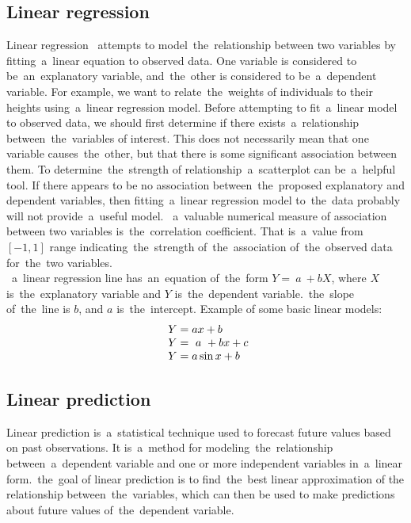         \subsection{Linear regression}\label{sec:linear}
        Linear regression~\cite{Levinson} attempts to model~the~relationship between two variables by fitting~a~linear
        equation to observed data. One variable is considered to be~an~explanatory variable, and~the~other is
        considered to be~a~dependent variable. For example, we want to relate~the~weights of individuals to their
        heights using~a~linear regression model. Before attempting to fit~a~linear model to observed data, we should
        first determine if there exists~a~relationship between~the~variables of interest. This does not necessarily
        mean that one variable causes~the~other, but that there is some significant association between them.
        To determine~the~strength of relationship~a~scatterplot can be~a~helpful tool.
        If there appears to be no association between~the~proposed explanatory and dependent variables, then
        fitting~a~linear regression model to~the~data probably will not provide~a~useful model.
       ~a~valuable numerical measure of association between two variables is~the~correlation coefficient.
        That is~a~value from $[-1, 1]$ range indicating~the~strength of~the~association of~the~observed data
        for~the~two variables.\\
       ~a~linear regression line has~an~equation of~the~form $Y =~a~+ bX$, where $X$ is~the~explanatory variable
        and $Y$ is~the~dependent variable.~the~slope of~the~line is $b$, and $a$ is~the~intercept.
        Example of some basic linear models:\\
        \begin{equation} \label{eq:4}
        \begin{array}{l@{}l}
            Y = ax + b\\
            Y =~a~+ bx + c\\
            Y = a\sin x + b\\
        \end{array}
        \end{equation}
        \subsection{Linear prediction}\label{subsec:lp}
        Linear prediction is~a~statistical technique used to forecast future values based on past observations.
        It is~a~method for modeling~the~relationship between~a~dependent variable and one or more independent
        variables in~a~linear form.~the~goal of linear prediction is to find~the~best linear approximation of the
        relationship between~the~variables, which can then be used to make predictions about future
        values of~the~dependent variable.
